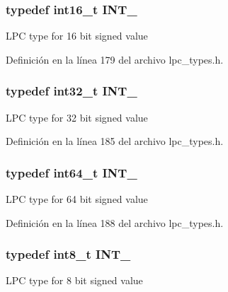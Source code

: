 \subsubsection[{\texorpdfstring{I\+N\+T\+\_\+16}{INT_16}}]{\setlength{\rightskip}{0pt plus 5cm}typedef int16\+\_\+t {\bf I\+N\+T\+\_}}\hypertarget{group___l_p_c___types___public___types_gaae6e34a91bf60db05de64de7720df9a5}{}\label{group___l_p_c___types___public___types_gaae6e34a91bf60db05de64de7720df9a5}
L\+PC type for 16 bit signed value 

Definición en la línea 179 del archivo lpc\+\_\+types.\+h.

\subsubsection[{\texorpdfstring{I\+N\+T\+\_\+32}{INT_32}}]{\setlength{\rightskip}{0pt plus 5cm}typedef int32\+\_\+t {\bf I\+N\+T\+\_}}\hypertarget{group___l_p_c___types___public___types_ga3a17614f3a1b67eaf20781d8ec16a652}{}\label{group___l_p_c___types___public___types_ga3a17614f3a1b67eaf20781d8ec16a652}
L\+PC type for 32 bit signed value 

Definición en la línea 185 del archivo lpc\+\_\+types.\+h.

\subsubsection[{\texorpdfstring{I\+N\+T\+\_\+64}{INT_64}}]{\setlength{\rightskip}{0pt plus 5cm}typedef int64\+\_\+t {\bf I\+N\+T\+\_}}\hypertarget{group___l_p_c___types___public___types_ga1a0aab29eee6b306564084e005fa5750}{}\label{group___l_p_c___types___public___types_ga1a0aab29eee6b306564084e005fa5750}
L\+PC type for 64 bit signed value 

Definición en la línea 188 del archivo lpc\+\_\+types.\+h.

\subsubsection[{\texorpdfstring{I\+N\+T\+\_\+8}{INT_8}}]{\setlength{\rightskip}{0pt plus 5cm}typedef int8\+\_\+t {\bf I\+N\+T\+\_}}\hypertarget{group___l_p_c___types___public___types_gac172005ce53b001f50a677cc10bd17b0}{}\label{group___l_p_c___types___public___types_gac172005ce53b001f50a677cc10bd17b0}
L\+PC type for 8 bit signed value 


